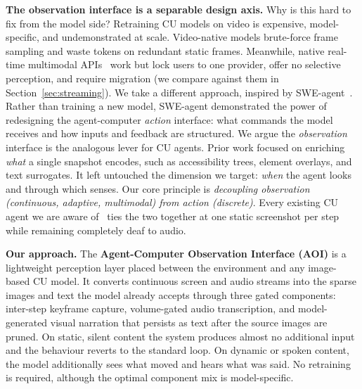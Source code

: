 \documentclass[11pt]{article}
\begin{document}
\textbf{The observation interface is a separable design axis.}
Why is this hard to fix from the model side?
Retraining CU models on video is expensive, model-specific, and undemonstrated
at scale. Video-native models brute-force frame sampling and waste tokens on
redundant static frames. Meanwhile, native real-time multimodal
APIs~\citep{geminilive,openairealtime} work but lock users to one provider, offer
no selective perception, and require migration (we compare against them in
Section~\ref{sec:streaming}).
We take a different approach, inspired by SWE-agent~\citep{sweagent}. Rather than
training a new model, SWE-agent demonstrated the power of redesigning the agent-computer \emph{action} interface: what commands the model receives and how inputs and feedback are structured.
We argue the \emph{observation} interface is the analogous lever for CU agents.
Prior work focused on enriching \emph{what} a single snapshot encodes, such as accessibility
trees, element overlays, and text surrogates. It left untouched the dimension we target:
\emph{when} the agent looks and through which senses.
Our core principle is \emph{decoupling observation (continuous, adaptive,
multimodal) from action (discrete)}. Every existing CU agent we are aware
of~\citep{anthropic2024claude,openai2025cua,gemini25cu,uitars2,opencua,fara7b,coact}
ties the two together at one static screenshot per step while remaining completely deaf to audio.

\textbf{Our approach.}
The \textbf{Agent-Computer Observation Interface (AOI)} is a lightweight
perception layer placed between the environment and any image-based CU model.
It converts continuous screen and audio streams into the sparse images and text
the model already accepts through three gated components:
inter-step keyframe capture, volume-gated audio transcription, and
model-generated visual narration that persists as text after the source
images are pruned.
On static, silent content the system produces almost no additional input and the behaviour reverts
to the standard loop. On dynamic or spoken content, the model additionally sees what moved
and hears what was said.
No retraining is required, although the optimal component mix is model-specific.
\end{document}
